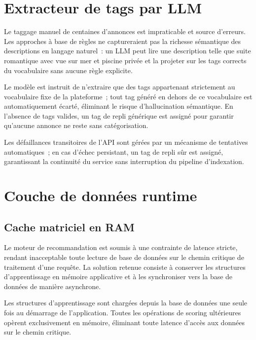 \section{Extracteur de tags par LLM}

Le taggage manuel de centaines d'annonces est impraticable et source 
d'erreurs. Les approches à base de règles ne captureraient pas la 
richesse sémantique des descriptions en langage naturel~: un LLM peut 
lire une description telle que \og{}suite romantique avec vue sur mer 
et piscine privée\fg{} et la projeter sur les tags corrects du 
vocabulaire sans aucune règle explicite.

Le modèle est instruit de n'extraire que des tags appartenant 
strictement au vocabulaire fixe de la plateforme~; tout tag généré 
en dehors de ce vocabulaire est automatiquement écarté, éliminant 
le risque d'hallucination sémantique. En l'absence de tags valides, 
un tag de repli générique est assigné pour garantir qu'aucune annonce 
ne reste sans catégorisation.

Les défaillances transitoires de l'API sont gérées par un mécanisme 
de tentatives automatiques~; en cas d'échec persistant, un tag de 
repli sûr est assigné, garantissant la continuité du service sans 
interruption du pipeline d'indexation.


\section{Couche de données runtime}

\subsection{Cache matriciel en RAM}

Le moteur de recommandation est soumis à une contrainte de latence 
stricte, rendant inacceptable toute lecture de base de données sur 
le chemin critique de traitement d'une requête. La solution retenue 
consiste à conserver les structures d'apprentissage en mémoire 
applicative et à les synchroniser vers la base de données de manière 
asynchrone.

Les structures d'apprentissage sont chargées depuis la base de données 
une seule fois au démarrage de l'application. Toutes les opérations 
de scoring ultérieures opèrent exclusivement en mémoire, éliminant 
toute latence d'accès aux données sur le chemin critique.

